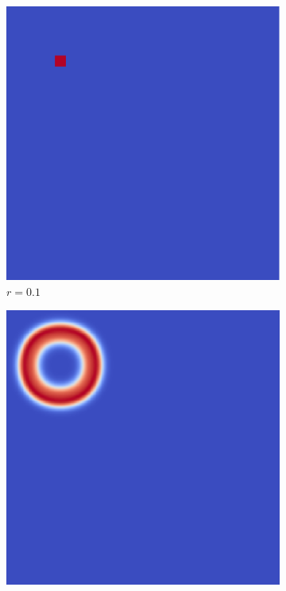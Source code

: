 \documentclass[12pt, letterpaper]{article}
\begin{document}
\begin{figure}[h]
  \caption{Coral Simulation}
  \label{fig:coralProgression}
  \centering
  \begin{subfigure}[b]{.22\linewidth}
    \includegraphics[width=\linewidth]{GrayScott/coral0.png}
    \caption{$r=0.1$}
  \end{subfigure}
  \begin{subfigure}[b]{.22\linewidth}
    \includegraphics[width=\linewidth]{GrayScott/coral1000.png}

\end{subfigure}
\end{figure}
\end{document}

